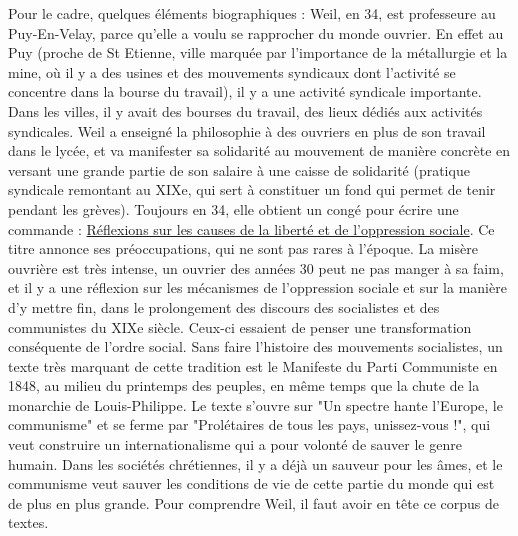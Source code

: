 \documentclass[a4paper,12pt]{book}
\begin{document}
\par Pour le cadre, quelques éléments biographiques : Weil, en 34, est professeure au Puy-En-Velay, parce qu'elle a voulu se rapprocher du monde ouvrier. En effet au Puy (proche de St Etienne, ville marquée par l'importance de la métallurgie et la mine, où il y a des usines et des mouvements syndicaux dont l'activité se concentre dans la bourse du travail), il y a une activité syndicale importante. Dans les villes, il y avait des bourses du travail, des lieux dédiés aux activités syndicales. Weil a enseigné la philosophie à des ouvriers en plus de son travail dans le lycée, et va manifester sa solidarité au mouvement de manière concrète en versant une grande partie de son salaire à une caisse de solidarité (pratique syndicale remontant au XIXe, qui sert à constituer un fond qui permet de tenir pendant les grèves). Toujours en 34, elle obtient un congé pour écrire une commande : \underline{Réflexions sur les causes de la liberté et de l'oppression sociale}. Ce titre annonce ses préoccupations, qui ne sont pas rares à l'époque. La misère ouvrière est très intense, un ouvrier des années 30 peut ne pas manger à sa faim, et il y a une réflexion sur les mécanismes de l'oppression sociale et sur la manière d'y mettre fin, dans le prolongement des discours des socialistes et des communistes du XIXe siècle. Ceux-ci essaient de penser une transformation conséquente de l'ordre social. Sans faire l'histoire des mouvements socialistes, un texte très marquant de cette tradition est le Manifeste du Parti Communiste en 1848, au milieu du printemps des peuples, en même temps que la chute de la monarchie de Louis-Philippe. Le texte s'ouvre sur "Un spectre hante l'Europe, le communisme" et se ferme par "Prolétaires de tous les pays, unissez-vous !", qui veut construire un internationalisme qui a pour volonté de sauver le genre humain. Dans les sociétés chrétiennes, il y a déjà un sauveur pour les âmes, et le communisme veut sauver les conditions de vie de cette partie du monde qui est de plus en plus grande. Pour comprendre Weil, il faut avoir en tête ce corpus de textes.
\end{document}

